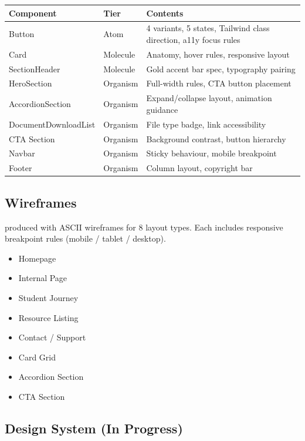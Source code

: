 \documentclass[12pt,a4paper]{article}
\begin{document}
\begin{longtable}{@{}L{3.6cm}L{2.2cm}L{7.4cm}@{}}
\toprule
{}
\textbf{Component} & \textbf{Tier} & \textbf{Contents} \\
\midrule
\endhead
Button & Atom & 4 variants, 5 states, Tailwind class direction, a11y focus rules \\
\addlinespace
Card & Molecule & Anatomy, hover rules, responsive layout \\
\addlinespace
SectionHeader & Molecule & Gold accent bar spec, typography pairing \\
\addlinespace
HeroSection & Organism & Full-width rules, CTA button placement \\
\addlinespace
AccordionSection & Organism & Expand/collapse layout, animation guidance \\
\addlinespace
DocumentDownloadList & Organism & File type badge, link accessibility \\
\addlinespace
CTA Section & Organism & Background contrast, button hierarchy \\
\addlinespace
Navbar & Organism & Sticky behaviour, mobile breakpoint \\
\addlinespace
Footer & Organism & Column layout, copyright bar \\
\bottomrule
\end{longtable}

\subsection{Wireframes}

 produced with ASCII wireframes for 8 layout types.
Each includes responsive breakpoint rules (mobile / tablet / desktop).

\begin{itemize}
    \item Homepage
    \item Internal Page
    \item Student Journey
    \item Resource Listing
    \item Contact / Support
    \item Card Grid
    \item Accordion Section
    \item CTA Section
\end{itemize}

\subsection{Design System (In Progress)}
\end{document}
